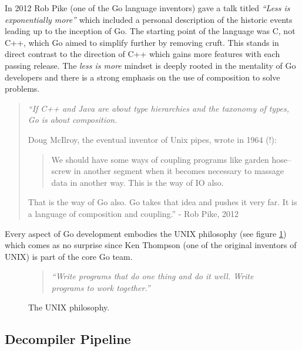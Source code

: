In 2012 Rob Pike (one of the Go language inventors) gave a talk titled \textit{``Less is exponentially more''} which included a personal description of the historic events leading up to the inception of Go. The starting point of the language was C, not C++, which Go aimed to simplify further by removing cruft. This stands in direct contrast to the direction of C++ which gains more features with each passing release. The \textit{less is more} mindset is deeply rooted in the mentality of Go developers and there is a strong emphasis on the use of composition to solve problems.

\begin{quote}
	\itshape
	``If C++ and Java are about type hierarchies and the taxonomy of types, Go is about composition.

	Doug McIlroy, the eventual inventor of Unix pipes, wrote in 1964 (!):

	\begin{quote}
		We should have some ways of coupling programs like garden hose--screw in another segment when it becomes necessary to massage data in another way. This is the way of IO also.
	\end{quote}

	That is the way of Go also. Go takes that idea and pushes it very far. It is a language of composition and coupling.''
	\normalfont
	- Rob Pike, 2012 \cite{less_is_more}
\end{quote}

Every aspect of Go development embodies the UNIX philosophy (see figure \ref{fig:unix_philosophy}) which comes as no surprise since Ken Thompson (one of the original inventors of UNIX) is part of the core Go team.

\begin{figure}[htbp]
	\begin{center}
		\begin{quote}
			\textit{``Write programs that do one thing and do it well. Write programs to work together.''} \cite{art_of_unix}
		\end{quote}
		\caption{The UNIX philosophy.}
		\label{fig:unix_philosophy}
	\end{center}
\end{figure}


\subsection{Decompiler Pipeline}

